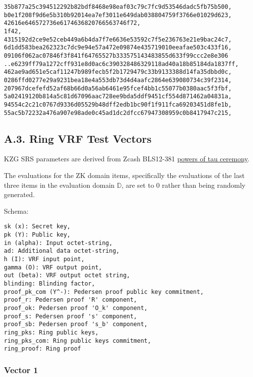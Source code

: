 \documentclass[
]{article}
\begin{document}
\begin{verbatim}
35b877a25c394512292b82bdf8468e98eaf03c79c7fc9d53546dadc5fb75b500,
b0e1f208f9d6e5b310b92014ea7ef3011e649dab038804759f3766e01029d623,
42616e646572736e6174636820766563746f72,
1f42,
4315192d2ce9e52ceb449a6b4da7f7e6636e53592c7f5e236763e21e9bac24c7,
6d1dd583bea262323c7dc9e94e57a472e09874e435719010eeafae503c433f16,
09106f062ac07846f3f841f64765527b333575143483855d633f99ccc2e8e306
..e6239ff79a1272cff931e8d0ac6c390328486329118ad40a18b85184da1837ff,
462ae9ad651e5caf11247b989fecb5f2b1729479c33b9133388d14fa35dbbd0c,
0286ffd0277e29a9231bea18e4a553db73d4d4aafc2864e639080734c39f2314,
207967dcefefd52af68b66d0a56ab6461e95fcef4bb1c55077b0380aac5f3fbf,
5a02419120b814a5c81d67096aac728ee9bda5ddf9451cf554d871462a04831a,
94554c2c21c0767d9336d05529b48dff2edb1bc90f1f911fca69203451d8fe1b,
55ac5b72232a476a907e98ade0c45ad1dc2dfcc67947308959c0b8417947c215,
\end{verbatim}

\hypertarget{a.3.-ring-vrf-test-vectors}{%
\subsection{A.3. Ring VRF Test
Vectors}\label{a.3.-ring-vrf-test-vectors}}

KZG SRS parameters are derived from Zcash BLS12-381
\href{https://zfnd.org/conclusion-of-the-powers-of-tau-ceremony}{powers
of tau ceremony}.

The evaluations for the ZK domain items, specifically the evaluations of
the last three items in the evaluation domain \(\mathbb{D}\), are set to
0 rather than being randomly generated.

Schema:

\begin{verbatim}
sk (x): Secret key,
pk (Y): Public key,
in (alpha): Input octet-string,
ad: Additional data octet-string,
h (I): VRF input point,
gamma (O): VRF output point,
out (beta): VRF output octet string,
blinding: Blinding factor,
proof_pk_com (Y^-): Pedersen proof public key commitment,
proof_r: Pedersen proof 'R' component,
proof_ok: Pedersen proof 'O_k' component,
proof_s: Pedersen proof 's' component,
proof_sb: Pedersen proof 's_b' component,
ring_pks: Ring public keys,
ring_pks_com: Ring public keys commitment,
ring_proof: Ring proof
\end{verbatim}

\hypertarget{vector-1-2}{%
\subsubsection{Vector 1}\label{vector-1-2}}
\end{document}
